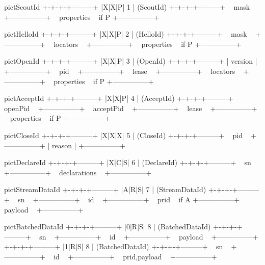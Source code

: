 \begin{SaveVerbatim}{pictScoutId}
+-+-+-+---------+
|X|X|P|    1    | (ScoutId)
+-+-+-+---------+
~     mask      ~
+---------------+
~  properties   ~ if P
+---------------+
\end{SaveVerbatim}
\begin{SaveVerbatim}{pictHelloId}
+-+-+-+---------+
|X|X|P|    2    | (HelloId)
+-+-+-+---------+
~     mask      ~
+---------------+
~   locators    ~
+---------------+
~  properties   ~ if P
+---------------+
\end{SaveVerbatim}
\begin{SaveVerbatim}{pictOpenId}
+-+-+-+---------+
|X|X|P|    3    | (OpenId)
+-+-+-+---------+
|    version    |
+---------------+
~      pid      ~
+---------------+
~     lease     ~
+---------------+
~   locators    ~
+---------------+
~  properties   ~ if P
+---------------+
\end{SaveVerbatim}
\begin{SaveVerbatim}{pictAcceptId}
+-+-+-+---------+
|X|X|P|    4    | (AcceptId)
+-+-+-+---------+
~    openPid    ~
+---------------+
~   acceptPid   ~
+---------------+
~     lease     ~
+---------------+
~  properties   ~ if P
+---------------+
\end{SaveVerbatim}
\begin{SaveVerbatim}{pictCloseId}
+-+-+-+---------+
|X|X|X|    5    | (CloseId)
+-+-+-+---------+
~      pid      ~
+---------------+
|    reason     |
+---------------+
\end{SaveVerbatim}
\begin{SaveVerbatim}{pictDeclareId}
+-+-+-+---------+
|X|C|S|    6    | (DeclareId)
+-+-+-+---------+
~      sn       ~
+---------------+
~ declarations  ~
+---------------+
\end{SaveVerbatim}
\begin{SaveVerbatim}{pictStreamDataId}
+-+-+-+---------+
|A|R|S|    7    | (StreamDataId)
+-+-+-+---------+
~      sn       ~
+---------------+
~      id       ~
+---------------+
~     prid      ~ if A
+---------------+
~    payload    ~
+---------------+
\end{SaveVerbatim}
\begin{SaveVerbatim}{pictBatchedDataId}
+-+-+-+---------+
|0|R|S|    8    | (BatchedDataId)
+-+-+-+---------+
~      sn       ~
+---------------+
~      id       ~
+---------------+
~    payload    ~
+---------------+
+-+-+-+---------+
|1|R|S|    8    | (BatchedDataId)
+-+-+-+---------+
~      sn       ~
+---------------+
~      id       ~
+---------------+
~ prid,payload  ~
+---------------+
\end{SaveVerbatim}
